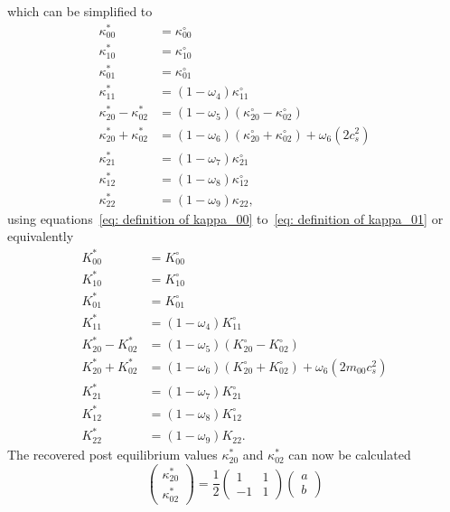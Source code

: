 which can be simplified to
\begin{equation}
  \label{eq: collision final before simplification}
  \begin{aligned}
    \kappa_{00}^{*} & = \kappa_{00}^{\circ}\\
    \kappa_{10}^{*} & = \kappa_{10}^{\circ}\\
    \kappa_{01}^{*} & = \kappa_{01}^{\circ}\\
    \kappa_{11}^{*} & = (1-\omega_4)\kappa_{11}^{\circ}\\
    \kappa_{20}^{*} - \kappa_{02}^{*}
      & = (1-\omega_5) (\kappa_{20}^{\circ}- \kappa_{02}^{\circ}) \\
    \kappa_{20}^{*} + \kappa_{02}^{*}
      & = (1-\omega_6)(\kappa_{20}^{\circ}+ \kappa_{02}^{\circ}) + \omega_6 \left( 2 c_s^2 \right) \\
    \kappa_{21}^{*} & = (1-\omega_7)\kappa_{21}^{\circ}\\
    \kappa_{12}^{*} & = (1-\omega_8)\kappa_{12}^{\circ}\\
    \kappa_{22}^{*} & = (1-\omega_9)\kappa_{22},
  \end{aligned}
\end{equation}
using equations~\eqref{eq: definition of kappa_00} to~\eqref{eq: definition of kappa_01} or equivalently
\begin{equation}
  \label{eq: collision final before simplification normalized}
  \begin{aligned}
    K_{00}^{*} & = K_{00}^{\circ}\\
    K_{10}^{*} & = K_{10}^{\circ}\\
    K_{01}^{*} & = K_{01}^{\circ}\\
    K_{11}^{*} & = (1-\omega_4)K_{11}^{\circ}\\
    K_{20}^{*} - K_{02}^{*}
      & = (1-\omega_5) (K_{20}^{\circ}- K_{02}^{\circ}) \\
    K_{20}^{*} + K_{02}^{*}
      & = (1-\omega_6)(K_{20}^{\circ}+ K_{02}^{\circ}) + \omega_6 \left( 2 m_{00} c_s^2 \right) \\
    K_{21}^{*} & = (1-\omega_7)K_{21}^{\circ}\\
    K_{12}^{*} & = (1-\omega_8)K_{12}^{\circ}\\
    K_{22}^{*} & = (1-\omega_9)K_{22}.
  \end{aligned}
\end{equation}
The recovered post equilibrium values $\kappa_{20}^{*}$ and $\kappa_{02}^{*}$ can now be calculated
\begin{equation}
  \begin{pmatrix}
    \kappa_{20}^{*} \\
    \kappa_{02}^{*}
  \end{pmatrix}
  = \frac{1}{2}
  \begin{pmatrix}
    1 & 1 \\ -1 & 1
  \end{pmatrix}
  \begin{pmatrix}
    a\\
    b
  \end{pmatrix}
\end{equation}
